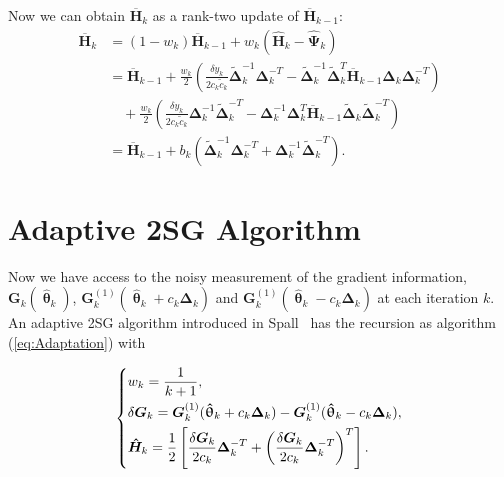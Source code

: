 \documentclass[conference,10.3cpt]{IEEEtran}
\newcommand{\bG}{\bm{G}}
\newcommand{\bDelta}{\bm{\Delta}}
\newcommand{\oH}{\bm{\overline{H}}}
\newcommand{\hH}{\bm{\hat{H}}}
\newcommand{\hPsi}{\bm{\hat{\Psi}}}
\newcommand{\htheta}{\bm{\hat{\uptheta}}}
\newcommand{\tDelta}{\bm{\tilde{\Delta}}}
\begin{document}
Now we can obtain $\oH_k$ as a rank-two update of $\oH_{k-1}$:
\begin{align*}
\oH_k&=(1-w_k)\oH_{k-1}+w_k(\hH_k-\hPsi_k)\\
     &=\oH_{k-1}+\frac{w_k}{2}(\frac{\delta y_k}{2c_k\tilde{c}_k}\tDelta_k^{-1}\bDelta_k^{-T}-\tDelta_k^{-1}\tDelta_k^{T}\oH_{k-1}\bDelta_k\bDelta_k^{-T})\\
     &\quad +\frac{w_k}{2}(\frac{\delta y_k}{2c_k\tilde{c}_k}\bDelta_k^{-1}\tDelta_k^{-T}-\bDelta_k^{-1}\bDelta_k^{T}\oH_{k-1}\tDelta_k\tDelta_k^{-T})\\
     &=\oH_{k-1}+b_k(\tDelta_k^{-1}\bDelta_k^{-T}+\bDelta_k^{-1}\tDelta_k^{-T}).
\end{align*}





\section{Adaptive 2SG Algorithm} \label{2SG}
Now we have
access to the noisy measurement of the gradient information,
$\bG_k(\htheta_k)$, $\bG_k^{(1)}(\htheta_k+ c_k\bDelta_k)$ and
$\bG_k^{(1)}(\htheta_k- c_k\bDelta_k)$ at each iteration $k$. An
adaptive 2SG algorithm introduced in Spall~\cite{Spall2000} has the
recursion as algorithm (\ref{eq:Adaptation}) with

\begin{equation} \label{eq:notationSG}
  \begin{dcases}
    w_k=\frac{1}{k+1},\\
    \delta\bG_k=\bG_k^{(1)}(\htheta_k+ c_k\bDelta_k)-\bG_k^{(1)}(\htheta_k- c_k\bDelta_k),\\
    \hH_k=\frac{1}{2}\left[ \frac{\delta\bG_k}{2c_k}\bDelta_k^{-T}+\left(\frac{\delta\bG_k}{2c_k}\bDelta_k^{-T}\right)^T \right].\\
  \end{dcases}
\end{equation}
\end{document}
